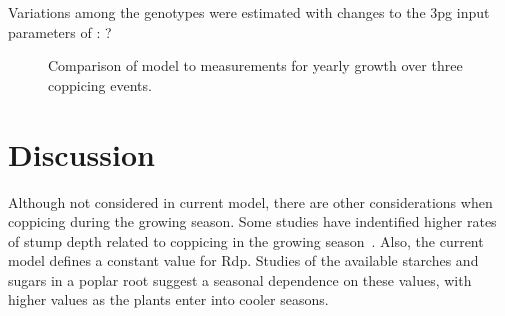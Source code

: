 \documentclass[10pt]{article}
\begin{document}
Variations among the genotypes were estimated with changes to the \ac{3pg}
input parameters of : ?

\begin{table}[!ht]
  \centering
    
  \caption{\ac{3pg} parameter variations of \ac{3pg} among genotypes}
  \label{tab:afas-3pg}
\end{table}

\begin{figure}[!ht]
  \centering
  
  \caption{Comparison of model to measurements for yearly growth over three
    coppicing events.}
\label{fig:afas-biomass}
\end{figure}

\section*{Discussion}

Although not considered in current model, there are other
considerations when coppicing during the growing season.  Some studies
have indentified higher rates of stump depth related to coppicing in
the growing season~\cite{}.  Also, the current model defines a
constant value for \ac{Rdp}.  Studies of the available starches and
sugars in a poplar root suggest a seasonal dependence on these values,
with higher values as the plants enter into cooler
seasons\cite{Regier2010}.




\end{document}
